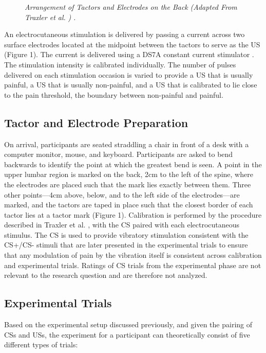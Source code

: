 \documentclass{article}
\begin{document}
  \begin{figure}

  \caption{\emph{Arrangement of Tactors and Electrodes on the Back} \emph{(Adapted From Traxler et al. }\autocite{bib7} \emph{)} \emph{.} }
\label{Figure 1}
 

\end{figure}
An electrocutaneous stimulation is delivered by passing a current across two surface electrodes located at the midpoint between the tactors to serve as the US (Figure 1). The current is delivered using a DS7A constant current stimulator \autocite{bib43} . The stimulation intensity is calibrated individually. The number of pulses delivered on each stimulation occasion is varied to provide a US  that is usually painful, a US  that is usually non-painful, and a US  that is calibrated to lie close to the pain threshold, the boundary between non-painful and painful. 

\subsection{Tactor and Electrode Preparation} 

On arrival, participants are seated straddling a chair in front of a desk with a computer monitor, mouse, and keyboard. Participants are asked to bend backwards to identify the point at which the greatest bend is seen. A point in the upper lumbar region is marked on the back, 2cm to the left of the spine, where the electrodes are placed such that the mark lies exactly between them. Three other points—4cm above, below, and to the left side of the electrodes—are marked, and the tactors are taped in place such that the closest border of each tactor lies at a tactor mark (Figure 1). Calibration is performed by the procedure described in Traxler et al. \autocite{bib7} , with the CS  paired with each electrocutaneous stimulus. The CS  is used to provide vibratory stimulation consistent with the CS+/CS- stimuli that are later presented in the experimental trials to ensure that any modulation of pain by the vibration itself is consistent across calibration and experimental trials. Ratings of CS  trials from the experimental phase are not relevant to the research question and are therefore not analyzed. 

\subsection{Experimental Trials} 

Based on the experimental setup discussed previously, and given the pairing of CSs and USs, the experiment for a participant can theoretically consist of five different types of trials:
\end{document}

